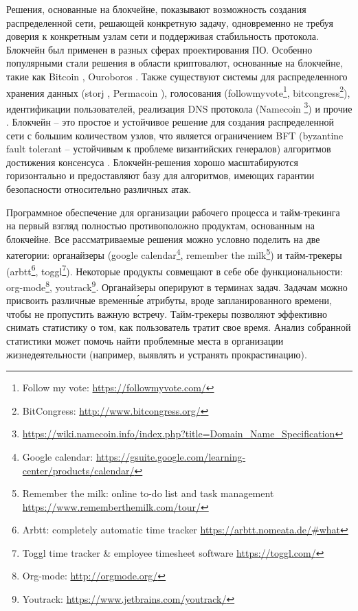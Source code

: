\documentclass[specification,annotation]{itmo-student-thesis}
\begin{document}
\tableofcontents

\startprefacepage

Решения, основанные на блокчейне, показывают возможность создания
распределенной сети, решающей конкретную задачу, одновременно не
требуя доверия к конкретным узлам сети и поддерживая стабильность
протокола. Блокчейн был применен в разных сферах проектирования
ПО. Особенно популярными стали решения в области криптовалют,
основанные на блокчейне, такие как Bitcoin \cite{bitcoin}, Ouroboros
\cite{ouroboros}. Также существуют системы для распределенного
хранения данных (storj \cite{wilkinson2014storj}, Permacoin
\cite{permacoin}), голосования (followmyvote\footnote{Follow my vote:
  \url{https://followmyvote.com/}}, bitcongress\footnote{BitCongress:
  \url{http://www.bitcongress.org/}}), идентификации пользователей,
реализация DNS протокола
(Namecoin \footnote{\url{https://wiki.namecoin.info/index.php?title=Domain_Name_Specification}})
и прочие \cite{swan2015blockchain}. Блокчейн -- это простое и
устойчивое решение для создания распределенной сети с большим
количеством узлов, что является ограничением BFT (byzantine fault
tolerant -- устойчивым к проблеме византийских генералов) алгоритмов
достижения консенсуса \cite{powbftquest}. Блокчейн-решения хорошо
масштабируются горизонтально и предоставляют базу для алгоритмов,
имеющих гарантии безопасности относительно различных атак.

Программное обеспечение для организации рабочего процесса и
тайм-трекинга на первый взгляд полностью противоположно продуктам,
основанным на блокчейне. Все рассматриваемые решения можно условно
поделить на две категории: органайзеры (google
calendar\footnote{Google calendar:
  \url{https://gsuite.google.com/learning-center/products/calendar/}},
remember the milk\footnote{Remember the milk: online to-do list and
  task management \url{https://www.rememberthemilk.com/tour/}}) и
тайм-трекеры (arbtt\footnote{Arbtt: completely automatic time tracker
  \url{https://arbtt.nomeata.de/#what}}, toggl\footnote{Toggl time
  tracker \& employee timesheet software
  \url{https://toggl.com/}}). Некоторые продукты совмещают в себе обе
функциональности: org-mode\footnote{Org-mode:
  \url{http://orgmode.org/}}, youtrack\footnote{ Youtrack:
  \url{https://www.jetbrains.com/youtrack/}}. Органайзеры оперируют в
терминах задач. Задачам можно присвоить различные временн\'{ы}е
атрибуты, вроде запланированного времени, чтобы не пропустить важную
встречу. Тайм-трекеры позволяют эффективно снимать статистику о том,
как пользователь тратит свое время. Анализ собранной статистики может
помочь найти проблемные места в организации жизнедеятельности
(например, выявлять и устранять прокрастинацию).
\end{document}
